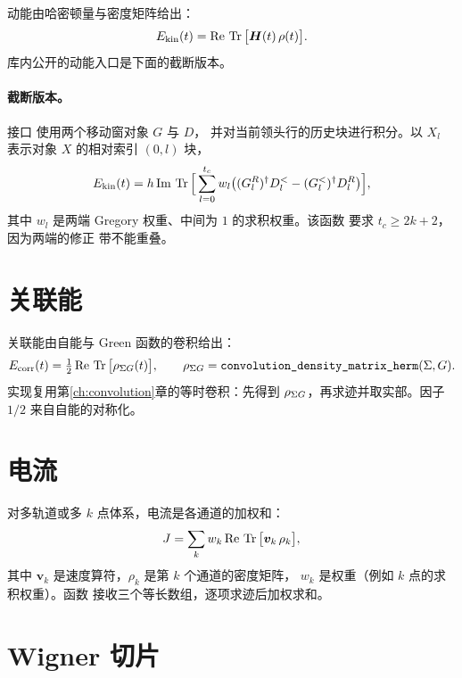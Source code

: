 动能由哈密顿量与密度矩阵给出：
\begin{equation}
    E_{\mathrm{kin}}(t) = \mathrm{Re}\,\operatorname{Tr}\big[\bm{H}(t)\,\rho(t)\big].
\end{equation}
库内公开的动能入口是下面的截断版本。

\paragraph{截断版本。}
接口  使用两个移动窗对象 $G$ 与 $D$，
并对当前领头行的历史块进行积分。以 $X_l$ 表示对象 $X$ 的相对索引 $(0,l)$ 块，
\begin{equation}
    E_{\mathrm{kin}}(t)
    =
    h\,\mathrm{Im}\,\operatorname{Tr}\Big[\sum^{t_c}_{l=0}w_l
    \big((G_l^R)^{\dagger}D_l^<-(G_l^<)^{\dagger}D_l^R\big)\Big],
\end{equation}
其中 $w_l$ 是两端 Gregory 权重、中间为 $1$ 的求积权重。该函数
 要求 $t_c\ge 2k+2$，因为两端的修正
带不能重叠。

\section{关联能}
\label{sec:corr-energy}

关联能由自能与 Green 函数的卷积给出：
\begin{equation}
    E_{\mathrm{corr}}(t)
    =
    \tfrac12\,\mathrm{Re}\,\operatorname{Tr}\big[\rho_{\Sigma G}(t)\big],
    \qquad
    \rho_{\Sigma G} = \texttt{convolution\_density\_matrix\_herm}(\Sigma,G).
\end{equation}
实现复用第\ref{ch:convolution}章的等时卷积：先得到
$\rho_{\Sigma G}$，再求迹并取实部。因子 $1/2$ 来自自能的对称化。

\section{电流}
\label{sec:current}

对多轨道或多 $k$ 点体系，电流是各通道的加权和：
\begin{equation}
    J = \sum_{k} w_k\,
    \mathrm{Re}\,\operatorname{Tr}\big[\bm{v}_k\,\rho_k\big],
\end{equation}
其中 $\bm{v}_k$ 是速度算符，$\rho_k$ 是第 $k$ 个通道的密度矩阵，
$w_k$ 是权重（例如 $k$ 点的求积权重）。函数 
接收三个等长数组，逐项求迹后加权求和。

\section{Wigner 切片}
\label{sec:wigner}

